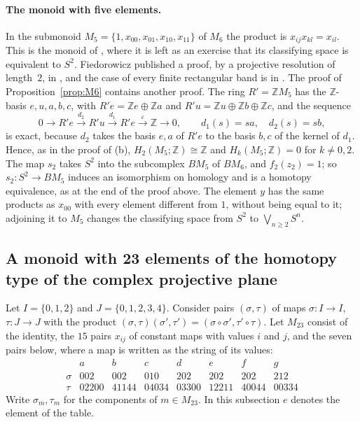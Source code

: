 \documentclass[11pt,a4paper]{article}
\theoremstyle{definition}
\newcommand{\Z}{\mathbb{Z}}
\begin{document}
\paragraph{The monoid with five elements.} In the submonoid
$M_5=\{1,x_{00},x_{01},x_{10},x_{11}\}$ of $M_6$ the product is
$x_{ij}x_{kl}=x_{il}$. This is the monoid of \cite[p.~323]{Fie}, where it is
left as an exercise that its classifying space is equivalent to $S^2$.
Fiedorowicz published a proof, by a projective resolution of length~$2$, in
\cite[Lemma, pp.~33--34]{Fie02}, and the case of every finite rectangular band
is in \cite[Theorem~3.1 and p.~8]{St}. The proof of
Proposition~\ref{prop:M6} contains another proof. The ring
$R'=\Z M_5$ has the $\Z$-basis $e,u,a,b,c$, with $R'e=\Z e\oplus\Z a$ and
$R'u=\Z u\oplus\Z b\oplus\Z c$, and the sequence
\[
 0\to R'e\xrightarrow{d_2}R'u\xrightarrow{d_1}R'e
 \xrightarrow{\varepsilon}\Z\to0,\qquad d_1(s)=sa,\quad d_2(s)=sb,
\]
is exact, because $d_2$ takes the basis $e,a$ of $R'e$ to the basis $b,c$ of
the kernel of $d_1$. Hence, as in the proof of (b), $H_2(M_5;\Z)\cong\Z$ and
$H_k(M_5;\Z)=0$ for $k\neq0,2$. The map $s_2$ takes $S^2$ into the subcomplex $BM_5$ of $BM_6$,
and $f_2(z_2)=1$; so $s_2\colon S^2\to BM_5$ induces an isomorphism on
homology and is a homotopy equivalence, as at the end of the proof above.
The element $y$ has the same products as $x_{00}$ with every element
different from $1$, without being equal to it; adjoining it to $M_5$ changes
the classifying space from $S^2$ to $\bigvee_{n\ge2}S^n$.

\subsection{A monoid with 23 elements of the homotopy type of the complex
projective plane}

Let $I=\{0,1,2\}$ and $J=\{0,1,2,3,4\}$. Consider pairs $(\sigma,\tau)$ of
maps $\sigma\colon I\to I$, $\tau\colon J\to J$ with the product
$(\sigma,\tau)(\sigma',\tau')=(\sigma\circ\sigma',\tau'\circ\tau)$. Let
$M_{23}$ consist of the identity, the $15$ pairs $x_{ij}$ of constant maps
with values $i$ and $j$, and the seven pairs below, where a map is written
as the string of its values:
\[
\begin{array}{c|ccccccc}
 &a&b&c&d&e&f&g\\\hline
\sigma&002&002&010&202&202&202&212\\
\tau&02200&41144&04034&03300&12211&40044&00334
\end{array}
\]
Write $\sigma_m,\tau_m$ for the components of $m\in M_{23}$. In this
subsection $e$ denotes the element of the table.
\end{document}
